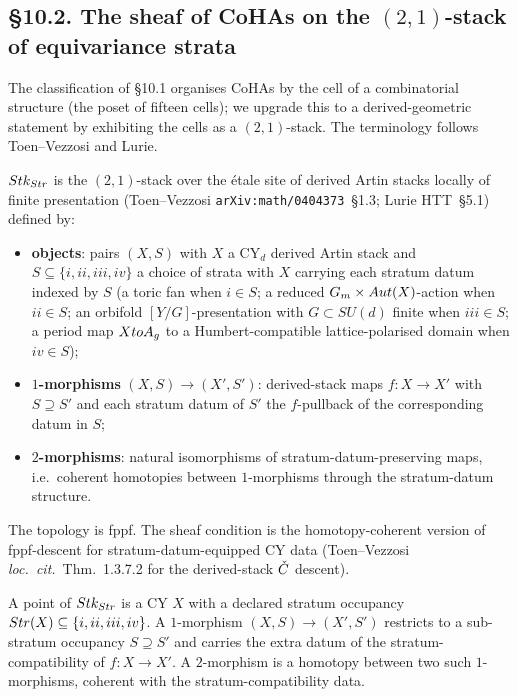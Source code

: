 \subsection*{\S 10.2. The sheaf of CoHAs on the $(2,1)$-stack of
equivariance strata}
\label{gluing:sec:10-2-sheaf-on-stack}

The classification of \S 10.1 organises CoHAs by the cell of a
combinatorial structure (the poset of fifteen cells); we upgrade this
to a derived-geometric statement by exhibiting the cells as a
$(2,1)$-stack. The terminology follows Toen--Vezzosi and Lurie.

\begin{definition}
\label{gluing:def:stratum-stack}
$Stk_{Str}$ is the $(2,1)$-stack over the \'etale site of derived
Artin stacks locally of finite presentation (Toen--Vezzosi
\texttt{arXiv:math/0404373}~\S 1.3; Lurie HTT~\S 5.1) defined by:
\begin{itemize}[leftmargin=1.5em]
 \item \textbf{objects}: pairs $(X,S)$ with $X$ a CY$_{d}$ derived
  Artin stack and $S\subseteq\{i,ii,iii,iv\}$ a choice of strata with
  $X$ carrying each stratum datum indexed by $S$ (a toric fan when
  $i\in S$; a reduced $G_{m}\times Aut(X)$-action when $ii\in S$; an
  orbifold $[Y/G]$-presentation with $G\subset SU(d)$ finite when
  $iii\in S$; a period map $XtoA_{g}$ to a Humbert-compatible
  lattice-polarised domain when $iv\in S$);
 \item \textbf{$1$-morphisms} $(X,S)\to(X',S')$: derived-stack maps
  $f:X\to X'$ with $S\supseteq S'$ and each stratum datum of $S'$ the
  $f$-pullback of the corresponding datum in $S$;
 \item \textbf{$2$-morphisms}: natural isomorphisms of
  stratum-datum-preserving maps, i.e.\ coherent homotopies between
  $1$-morphisms through the stratum-datum structure.
\end{itemize}
The topology is fppf. The sheaf condition is the homotopy-coherent
version of fppf-descent for stratum-datum-equipped CY data
(Toen--Vezzosi \emph{loc.~cit.}~Thm.~1.3.7.2 for the derived-stack
$\check{C}$ descent).
\end{definition}

\begin{remark}
A point of $Stk_{Str}$ is a CY $X$ with a declared stratum occupancy
$Str(X)\subseteq\{i,ii,iii,iv\}$. A $1$-morphism
$(X,S)\to(X',S')$ restricts to a sub-stratum occupancy $S\supseteq S'$
and carries the extra datum of the stratum-compatibility of
$f:X\to X'$. A $2$-morphism is a homotopy between two such
$1$-morphisms, coherent with the stratum-compatibility data.
\end{remark}

